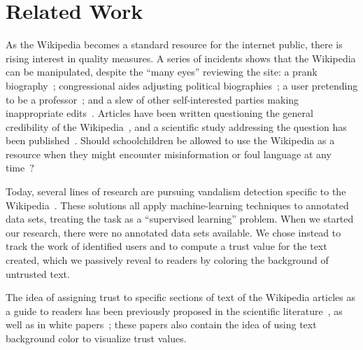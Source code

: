 \section{Related Work}

As the Wikipedia becomes a standard resource for the internet
public, there is rising interest in quality measures.
A series of incidents shows that the Wikipedia can be manipulated,
despite the ``many eyes'' reviewing the site:
a prank biography~\cite{Seigenthaler05,NewYorkTimes05a,NewYorkTimes05b};
congressional aides adjusting political
biographies~\cite{Lehmann2006,NewZelandHerald06,Davis2006};
a user pretending to be a professor~\cite{BBC07};
and a slew of other self-interested parties making
inappropriate edits~\cite{Wired07,Wikiscanner07,Noguchi2008}.
Articles have been written questioning the
general credibility of the Wikipedia~\cite{Stross2006,Schiff2006},
and a scientific study addressing the question
has been published~\cite{Giles2005}.
Should schoolchildren be allowed to use the Wikipedia as
a resource when they might encounter misinformation or foul
language at any time~\cite{Gralla2007,Olanoff2007}?

Today, several lines of research are pursuing
vandalism detection specific to the Wikipedia~\cite{Potthast2010b}.
These solutions all apply machine-learning techniques
to annotated data sets, treating the task as a
``supervised learning'' problem.
When we started our research, there were no annotated
data sets available.
We chose instead to track the work of identified users and to compute a
trust value for the text created, which we passively reveal to readers
by coloring the background of untrusted text.

The idea of assigning trust to specific sections of text of the Wikipedia
articles as a guide to readers has been previously proposed in the scientific
literature~\cite{WikiMTWtrust06,Cross2006,McGuinness06}, as well as in white
papers~\cite{King2007}; these papers also contain
the idea of using text background color to visualize trust values.


